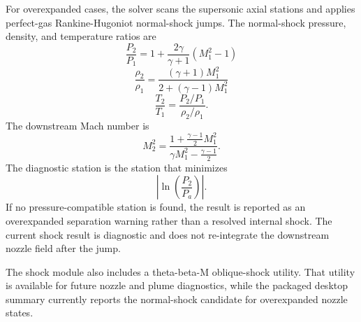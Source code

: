 \documentclass[11pt]{article}
\begin{document}
For overexpanded cases, the solver scans the supersonic axial stations and applies perfect-gas Rankine-Hugoniot normal-shock jumps. The normal-shock pressure, density, and temperature ratios are
\begin{equation}
\frac{P_2}{P_1}=1+\frac{2\gamma}{\gamma+1}\left(M_1^2-1\right)
\label{eq:shock-pressure-ratio}
\end{equation}
\begin{equation}
\frac{\rho_2}{\rho_1}=\frac{(\gamma+1)M_1^2}{2+(\gamma-1)M_1^2}
\label{eq:shock-density-ratio}
\end{equation}
\begin{equation}
\frac{T_2}{T_1}=\frac{P_2/P_1}{\rho_2/\rho_1}.
\label{eq:shock-temperature-ratio}
\end{equation}
The downstream Mach number is
\begin{equation}
M_2^2=
\frac{1+\frac{\gamma-1}{2}M_1^2}
{\gamma M_1^2-\frac{\gamma-1}{2}}.
\label{eq:shock-downstream-mach}
\end{equation}
The diagnostic station is the station that minimizes
\begin{equation}
\left|\ln\!\left(\frac{P_2}{P_a}\right)\right|.
\label{eq:shock-station-score}
\end{equation}
If no pressure-compatible station is found, the result is reported as an overexpanded separation warning rather than a resolved internal shock. The current shock result is diagnostic and does not re-integrate the downstream nozzle field after the jump.

The shock module also includes a theta-beta-M oblique-shock utility. That utility is available for future nozzle and plume diagnostics, while the packaged desktop summary currently reports the normal-shock candidate for overexpanded nozzle states.
\end{document}
